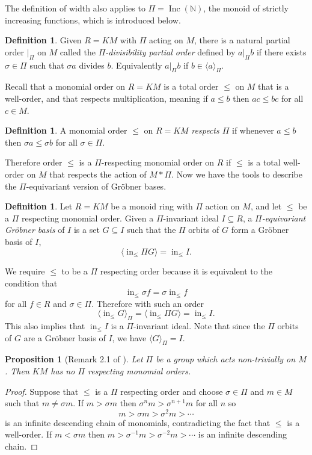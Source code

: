 \documentclass{article}
\theoremstyle{plain}
\newtheorem{proposition}[theorem]{Proposition}
\theoremstyle{definition}
\newtheorem{definition}[theorem]{Definition}
\numberwithin{equation}{section}
\newcommand{\B}[1]{\mathbb #1}
\newcommand{\ideal}[1]{\langle #1 \rangle}
\DeclareMathOperator{\initial}{in}
\newcommand{\Inc}{\operatorname{Inc}(\B N)}
\newcommand{\mon}{M}
\newcommand{\LT}{\initial_{\leq}}
\begin{document}
The definition of width also applies to $\Pi = \Inc$, the monoid of strictly increasing functions, which is introduced below.
 
\begin{definition}
 Given $R = K\mon$ with $\Pi$ acting on $\mon$, there is a natural partial order $|_\Pi$ on $\mon$ called the {\em $\Pi$-divisibility partial order} defined by $a |_\Pi b$ if there exists $\sigma \in \Pi$ such that $\sigma a$ divides $b$.  Equivalently $a |_\Pi b$ if $b \in \ideal{a}_\Pi$.
\end{definition}

Recall that a monomial order on $R = K\mon$ is a total order $\leq$ on $\mon$ that is a well-order, and that respects multiplication, meaning if $a \leq b$ then $ac \leq bc$ for all $c \in \mon$.

\begin{definition}
 A monomial order $\leq$ on $R = K\mon$ {\em respects $\Pi$} if whenever $a \leq b$ then $\sigma a \leq \sigma b$ for all $\sigma \in \Pi$.
\end{definition}

Therefore order $\leq$ is a $\Pi$-respecting monomial order on $R$ if $\leq$ is a total well-order on $M$ that respects the action of $\mon*\Pi$.
Now we have the tools to describe the $\Pi$-equivariant version of Gr\"obner bases.
\begin{definition}
 Let $R = K\mon$ be a monoid ring with $\Pi$ action on $\mon$, and let $\leq$ be a $\Pi$ respecting monomial order.  Given a $\Pi$-invariant ideal $I \subseteq R$, a {\em $\Pi$-equivariant Gr\"obner basis} of $I$ is a set $G \subseteq I$ such that the $\Pi$ orbits of $G$ form a Gr\"obner basis of $I$,
 \[ \ideal{\LT \Pi G} = \LT I. \]
\end{definition}
We require $\leq$ to be a $\Pi$ respecting order because it is equivalent to the condition that
\[ \LT \sigma f = \sigma \LT f \]
for all $f \in R$ and $\sigma \in \Pi$.  Therefore with such an order
 \[ \ideal{\LT G}_{\Pi} = \ideal{\LT \Pi G} = \LT I. \]
This also implies that $\LT I$ is a $\Pi$-invariant ideal.  Note that since the $\Pi$ orbits of $G$ are a Gr\"obner basis of $I$, we have $\ideal{G}_\Pi = I$.


\begin{proposition}[Remark 2.1 of \cite{Brouwer09e}]\label{prop:nogroup}
 Let $\Pi$ be a group which acts non-trivially on $\mon$.  Then $K\mon$ has no $\Pi$ respecting monomial orders.
\end{proposition}
\begin{proof}
 Suppose that $\leq$ is a $\Pi$ respecting order and choose $\sigma \in \Pi$ and $m \in \mon$ such that $m \neq \sigma m$.  If $m > \sigma m$ then $\sigma^n m > \sigma^{n+1} m$ for all $n$ so
  \[ m > \sigma m > \sigma^2 m > \cdots \]
 is an infinite descending chain of monomials, contradicting the fact that $\leq$ is a well-order.  If $m < \sigma m$ then $m > \sigma^{-1} m > \sigma^{-2} m > \cdots$ is an infinite descending chain.
\end{proof}
\end{document}
